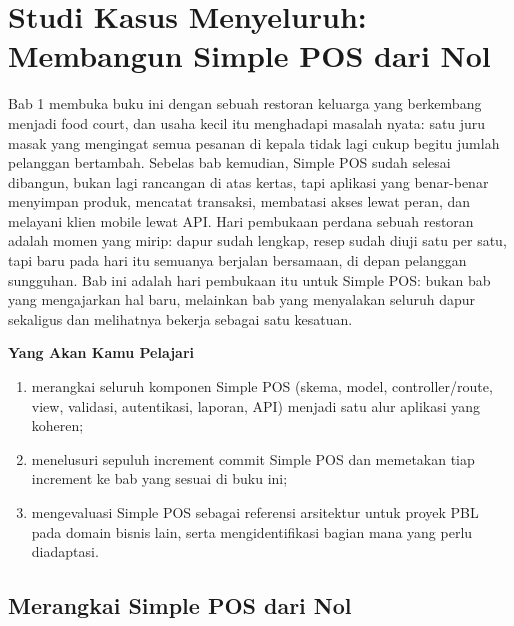 
\chapter{Studi Kasus Menyeluruh: Membangun Simple POS dari Nol}
\label{ch:studi-kasus-menyeluruh}


Bab 1 membuka buku ini dengan sebuah restoran keluarga yang berkembang
menjadi food court, dan usaha kecil itu menghadapi masalah nyata: satu
juru masak yang mengingat semua pesanan di kepala tidak lagi cukup
begitu jumlah pelanggan bertambah. Sebelas bab kemudian, Simple POS
sudah selesai dibangun, bukan lagi rancangan di atas kertas, tapi
aplikasi yang benar-benar menyimpan produk, mencatat transaksi, membatasi
akses lewat peran, dan melayani klien mobile lewat API. Hari pembukaan
perdana sebuah restoran adalah momen yang mirip: dapur sudah lengkap,
resep sudah diuji satu per satu, tapi baru pada hari itu semuanya
berjalan bersamaan, di depan pelanggan sungguhan. Bab ini adalah hari
pembukaan itu untuk Simple POS: bukan bab yang mengajarkan hal baru,
melainkan bab yang menyalakan seluruh dapur sekaligus dan melihatnya
bekerja sebagai satu kesatuan.

\textbf{Yang Akan Kamu Pelajari}

\begin{enumerate}
  \item merangkai seluruh komponen Simple POS (skema, model, controller/route, view, validasi, autentikasi, laporan, API) menjadi satu alur aplikasi yang koheren;
  \item menelusuri sepuluh increment commit Simple POS dan memetakan tiap increment ke bab yang sesuai di buku ini;
  \item mengevaluasi Simple POS sebagai referensi arsitektur untuk proyek PBL pada domain bisnis lain, serta mengidentifikasi bagian mana yang perlu diadaptasi.
\end{enumerate}

\section{Merangkai Simple POS dari Nol}
\label{sec:studi-kasus-menyeluruh-1}

